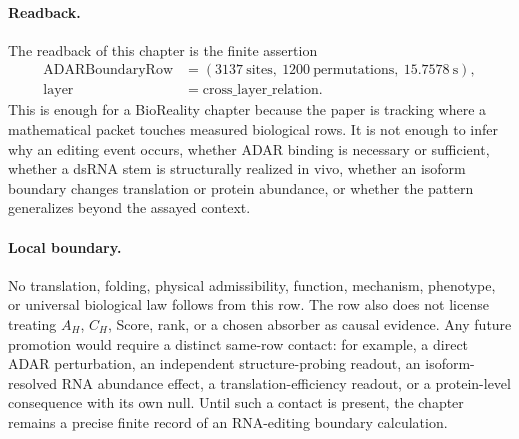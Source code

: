 \paragraph{Readback.}
The readback of this chapter is the finite assertion
$$
\begin{aligned}
\mathrm{ADARBoundaryRow} &= (3137\ \mathrm{sites},\ 1200\ \mathrm{permutations},\ 15.7578\ \mathrm{s}),\\
\mathrm{layer} &= \mathrm{cross\_layer\_relation}.
\end{aligned}
$$
This is enough for a BioReality chapter because the paper is tracking where a mathematical packet touches measured biological rows.  It is not enough to infer why an editing event occurs, whether ADAR binding is necessary or sufficient, whether a dsRNA stem is structurally realized in vivo, whether an isoform boundary changes translation or protein abundance, or whether the pattern generalizes beyond the assayed context.

\paragraph{Local boundary.}
No translation, folding, physical admissibility, function, mechanism, phenotype, or universal biological law follows from this row.  The row also does not license treating $A_H$, $C_H$, Score, rank, or a chosen absorber as causal evidence.  Any future promotion would require a distinct same-row contact: for example, a direct ADAR perturbation, an independent structure-probing readout, an isoform-resolved RNA abundance effect, a translation-efficiency readout, or a protein-level consequence with its own null.  Until such a contact is present, the chapter remains a precise finite record of an RNA-editing boundary calculation.